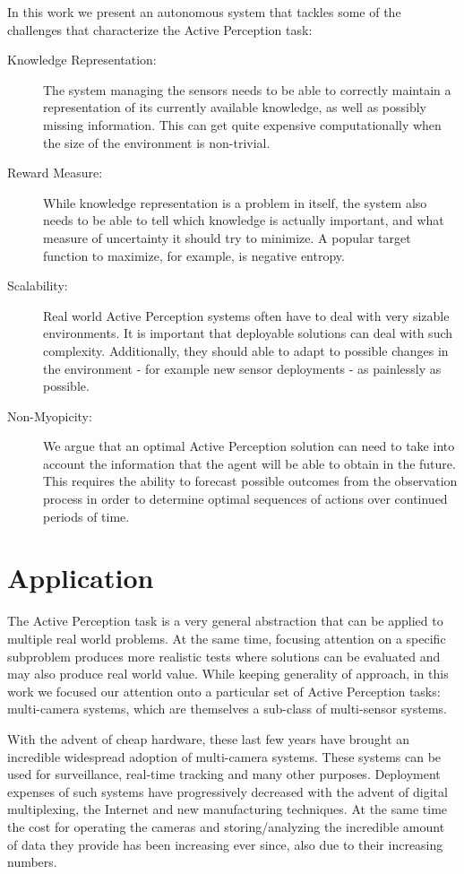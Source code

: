 In this work we present an autonomous system that tackles some of the challenges that characterize
the Active Perception task:

\begin{description}
\item[Knowledge Representation:] The system managing the sensors needs to be able to correctly
    maintain a representation of its currently available knowledge, as well as possibly missing
    information. This can get quite expensive computationally when the size of the environment is
    non-trivial.
\item[Reward Measure:] While knowledge representation is a problem in itself, the system also needs
    to be able to tell which knowledge is actually important, and what measure of uncertainty it
    should try to minimize. A popular target function to maximize, for example, is negative entropy.
\item[Scalability:] Real world Active Perception systems often have to deal with very sizable
    environments. It is important that deployable solutions can deal with such complexity.
    Additionally, they should able to adapt to possible changes in the environment - for example new
    sensor deployments - as painlessly as possible.
\item[Non-Myopicity:] We argue that an optimal Active Perception solution can need to take into
    account the information that the agent will be able to obtain in the future. This requires the
    ability to forecast possible outcomes from the observation process in order to determine optimal
    sequences of actions over continued periods of time.
\end{description}

\section{Application}

The Active Perception task is a very general abstraction that can be applied to multiple real world
problems. At the same time, focusing attention on a specific subproblem produces more realistic
tests where solutions can be evaluated and may also produce real world value. While keeping
generality of approach, in this work we focused our attention onto a particular set of Active
Perception tasks: multi-camera systems, which are themselves a sub-class of multi-sensor systems.

With the advent of cheap hardware, these last few years have brought an incredible widespread
adoption of multi-camera systems. These systems can be used for surveillance, real-time tracking and
many other purposes. Deployment expenses of such systems have progressively decreased with the
advent of digital multiplexing, the Internet and new manufacturing techniques. At the same time the
cost for operating the cameras and storing/analyzing the incredible amount of data they provide has
been increasing ever since, also due to their increasing numbers.

